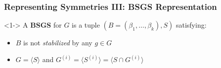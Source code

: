 \documentclass{beamer}
\begin{document}
\begin{frame}
  \frametitle{Representing Symmetries III: BSGS Representation}

  \begin{definition}<1->
    A \textbf{BSGS} for $G$ is a tuple $(B = (\beta_1, \dots, \beta_k), S)$
    satisfying:
    \begin{itemize}
      \item $B$ is not \textit{stabilized} by any $g \in G$
      \item $G = \langle S \rangle$ and $G^{(i)} = \langle S^{(i)} \rangle =
            \langle S \cap G^{(i)} \rangle$
    \end{itemize}
  \end{definition}

  \vspace{.25cm}

\end{frame}
\end{document}
